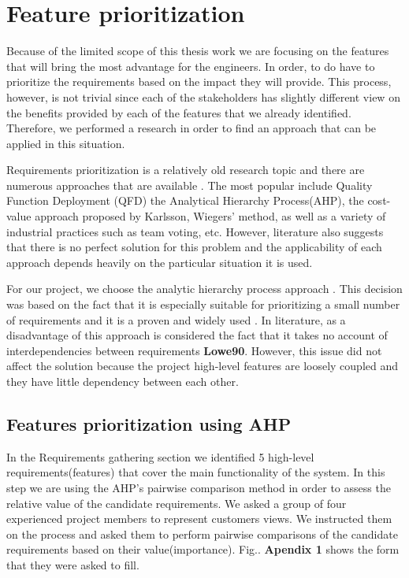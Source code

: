 \section{Feature prioritization}

Because of the limited scope of this thesis work we are focusing on the features that will bring the most advantage for the engineers. In order, to do have to prioritize the requirements based on the impact they will provide. This process, however, is not trivial since each of the stakeholders has slightly different view on the benefits provided by each of the features that we already identified. Therefore, we performed a research in order to find an approach that can be applied in this situation.

Requirements prioritization is a relatively old research topic and there are numerous approaches that are available \cite{Moisiadis}. The most popular include Quality Function Deployment (QFD) the Analytical Hierarchy Process(AHP), the cost-value approach proposed by Karlsson, Wiegers' method, as well as a variety of industrial practices such as team voting, etc. However, literature also suggests that there is no perfect solution for this problem and the applicability of each approach depends heavily on the particular situation it is used.

For our project, we choose the analytic hierarchy process approach \cite{Lowe90} . This decision was based on the fact that it is especially suitable for prioritizing a small number of requirements\cite{Karlsson} and it is a proven and widely used \cite{Karlsson2}. In literature, as a disadvantage of this approach is considered the fact that it takes no account of interdependencies between requirements \textbf{Lowe90}. However, this issue did not affect the solution because the project high-level features are loosely coupled and they have little dependency between each other. 


\subsection{Features prioritization using AHP}
In the Requirements gathering section we identified 5 high-level requirements(features) that cover the main functionality of the system. In this step we are using the AHP's pairwise comparison method in order to assess the relative value of the candidate requirements. We asked a group of four experienced project members to represent customers views. We instructed them on the process and asked them to perform  pairwise comparisons of the candidate requirements based on their value(importance). Fig.. \textbf{Apendix 1} shows the form that they were asked to fill.

